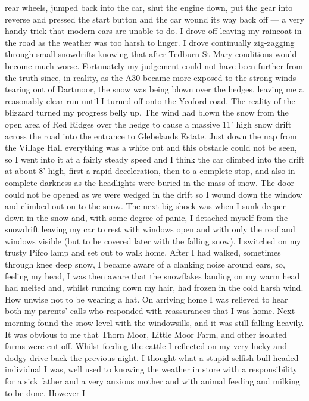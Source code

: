 rear wheels, jumped back into the car, shut the engine down, put the gear into
reverse and pressed the start button and the car wound its way back off --- a
very handy trick that modern cars are unable to do. I drove off leaving my
raincoat in the road as the weather was too harsh to linger. I drove
continually zig-zagging through small snowdrifts knowing that after Tedburn St
Mary conditions would become much worse. Fortunately my judgement could not
have been further from the truth since, in reality, as the A30 became more
exposed to the strong winds tearing out of Dartmoor, the snow was being blown
over the hedges, leaving me a reasonably clear run until I turned off onto the
Yeoford road. The reality of the blizzard turned my progress belly up. The wind
had blown the snow from the open area of Red Ridges over the hedge to cause a
massive 11' high snow drift across the road into the entrance to Glebelands
Estate. Just down the nap from the Village Hall everything was a white out and
this obstacle could not be seen, so I went into it at a fairly steady speed and
I think the car climbed into the drift at about 8' high, first a rapid
deceleration, then to a complete stop, and also in complete darkness as the
headlights were buried in the mass of snow. The door could not be opened as we
were wedged in the drift so I wound down the window and climbed out on to the
snow. The next big shock was when I sunk deeper down in the snow and, with some
degree of panic, I detached myself from the snowdrift leaving my car to rest
with windows open and with only the roof and windows visible (but to be covered
later with the falling snow). I switched on my trusty Pifco lamp and set out to
walk home. After I had walked, sometimes through knee deep snow, I became aware
of a clanking noise around ears, so, feeling my head, I was then aware that the
snowflakes landing on my warm head had melted and, whilst running down my hair,
had frozen in the cold harsh wind. How unwise not to be wearing a hat. On
arriving home I was relieved to hear both my parents' calls who responded with
reassurances that I was home. Next morning found the snow level with the
windowsills, and it was still falling heavily. It was obvious to me that Thorn
Moor, Little Moor Farm, and other isolated farms were cut off. Whilst feeding
the cattle I reflected on my very lucky and dodgy drive back the previous
night. I thought what a stupid selfish bull-headed individual I was, well used
to knowing the weather in store with a responsibility for a sick father and a
very anxious mother and with animal feeding and milking to be done. However I
